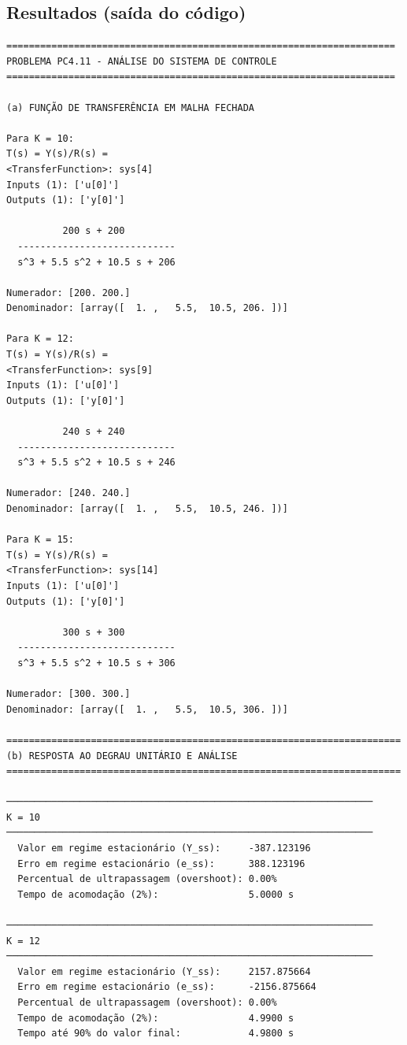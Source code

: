 \documentclass[12pt,a4paper]{article}
\begin{document}
\subsection*{Resultados (saída do código)}
\begin{lstlisting}
=====================================================================
PROBLEMA PC4.11 - ANÁLISE DO SISTEMA DE CONTROLE
=====================================================================

(a) FUNÇÃO DE TRANSFERÊNCIA EM MALHA FECHADA

Para K = 10:
T(s) = Y(s)/R(s) =
<TransferFunction>: sys[4]
Inputs (1): ['u[0]']
Outputs (1): ['y[0]']

          200 s + 200
  ----------------------------
  s^3 + 5.5 s^2 + 10.5 s + 206

Numerador: [200. 200.]
Denominador: [array([  1. ,   5.5,  10.5, 206. ])]

Para K = 12:
T(s) = Y(s)/R(s) =
<TransferFunction>: sys[9]
Inputs (1): ['u[0]']
Outputs (1): ['y[0]']

          240 s + 240
  ----------------------------
  s^3 + 5.5 s^2 + 10.5 s + 246

Numerador: [240. 240.]
Denominador: [array([  1. ,   5.5,  10.5, 246. ])]

Para K = 15:
T(s) = Y(s)/R(s) =
<TransferFunction>: sys[14]
Inputs (1): ['u[0]']
Outputs (1): ['y[0]']

          300 s + 300
  ----------------------------
  s^3 + 5.5 s^2 + 10.5 s + 306

Numerador: [300. 300.]
Denominador: [array([  1. ,   5.5,  10.5, 306. ])]

======================================================================
(b) RESPOSTA AO DEGRAU UNITÁRIO E ANÁLISE
======================================================================

─────────────────────────────────────────────────────────────────
K = 10
─────────────────────────────────────────────────────────────────
  Valor em regime estacionário (Y_ss):     -387.123196
  Erro em regime estacionário (e_ss):      388.123196
  Percentual de ultrapassagem (overshoot): 0.00%
  Tempo de acomodação (2%):                5.0000 s

─────────────────────────────────────────────────────────────────
K = 12
─────────────────────────────────────────────────────────────────
  Valor em regime estacionário (Y_ss):     2157.875664
  Erro em regime estacionário (e_ss):      -2156.875664
  Percentual de ultrapassagem (overshoot): 0.00%
  Tempo de acomodação (2%):                4.9900 s
  Tempo até 90% do valor final:            4.9800 s


\end{lstlisting}
\end{document}
